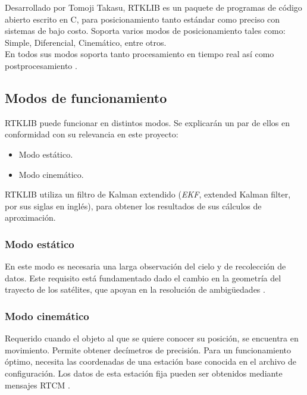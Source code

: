 
Desarrollado por Tomoji Takasu, RTKLIB es un paquete de programas de código abierto escrito en C, para posicionamiento tanto estándar como preciso con sistemas de bajo costo. Soporta varios modos de posicionamiento tales como: Simple, Diferencial, Cinemático, entre otros. \\

En todos sus modos soporta tanto procesamiento en tiempo real así como postprocesamiento \citep{takasu2009development}.

\subsection{Modos de funcionamiento}

RTKLIB puede funcionar en distintos modos. Se explicarán un par de ellos en conformidad con su relevancia en este proyecto:

\begin{itemize}
\item Modo estático.
\item Modo cinemático.
\end{itemize}

RTKLIB utiliza un filtro de Kalman extendido (\textit{EKF}, extended Kalman filter, por sus siglas en inglés), para obtener los resultados de sus cálculos de aproximación. 

\subsubsection{Modo estático}
En este modo es necesaria una larga observación del cielo y de recolección de datos. Este requisito está fundamentado dado el cambio en la geometría del trayecto de los satélites, que apoyan en la resolución de ambigüedades \citep{wisniewski2013evaluation}.

\subsubsection{Modo cinemático}
Requerido cuando el objeto al que se quiere conocer su posición, se encuentra en movimiento. Permite obtener decímetros de precisión. Para un funcionamiento óptimo, necesita las coordenadas de una estación base conocida en el archivo de configuración. Los datos de esta estación fija pueden ser obtenidos mediante mensajes RTCM \citep{wisniewski2013evaluation}.


